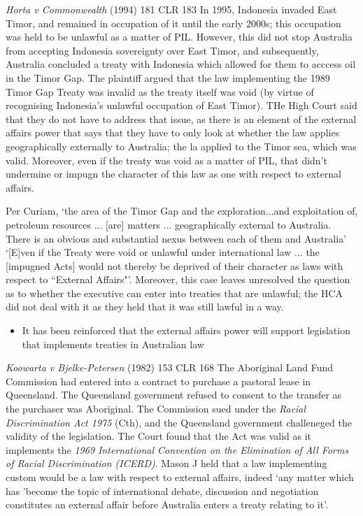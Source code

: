 \begin{casedetails}{\textit{Horta v Commonwealth} (1994) 181 CLR 183}
    \flushleft
    In 1995, Indonesia invaded East Timor, and remained in occupation of it until the early 2000s; this occupation was held to be unlawful as a matter of PIL. However, this did not stop Australia from accepting Indonesia sovereignty over East Timor, and subsequently, Australia concluded a treaty with Indonesia which allowed for them to acccess oil in the Timor Gap. The plaintiff argued that the law implementing the 1989 Timor Gap Treaty was invalid as the treaty itself was void (by virtue of recognising Indonesia's unlawful occupation of East Timor). THe High Court said that they do not have to address that issue, as there is an element of the external affairs power that says that they have to only look at whether the law applies geographically externally to Australia; the la applied to the Timor sea, which was valid. Moreover, even if the treaty was void as a matter of PIL, that didn't undermine or impugn the character of this law as one with respect to external affairs.

    \vspace{\baselineskip}

    Per Curiam, `the area of the Timor Gap and the exploration...and exploitation of, petroleum resources ... [are] matters ... geographically external to Australia. There is an obvious and substantial nexus between each of them and Australia' `[E]ven if the Treaty were void or unlawful under international law ... the [impugned Acts] would not thereby be deprived of their character as laws with respect to ``External Affairs"'. Moreover, this case leaves unresolved the question as to whether the executive can enter into treaties that are unlawful; the HCA did not deal with it as they held that it was still lawful in a way.
\end{casedetails}

\begin{itemize}
    \item It has been reinforced that the external affairs power will support legislation that implements treaties in Australian law
\end{itemize}

\begin{casedetails}{\textit{Koowarta v Bjelke-Petersen} (1982) 153 CLR 168}
    \flushleft
    The Aboriginal Land Fund Commission had entered into a contract to purchase a pastoral lease in Queensland. The Queensland government refused to consent to the transfer as the purchaser was Aboriginal. The Commission sued under the \textit{Racial Discrimination Act 1975} (Cth), and the Queensland government challeneged the validity of the legislation. The Court found that the Act was valid as it implements the \textit{1969 International Convention on the Elimination of All Forms of Racial Discrimination (ICERD)}. Mason J held that a law implementing custom would be a law with respect to external affairs, indeed `any matter which has 'become the topic of international debate, discussion and negotiation constitutes an external affair before Australia enters a treaty relating to it'.
\end{casedetails}

